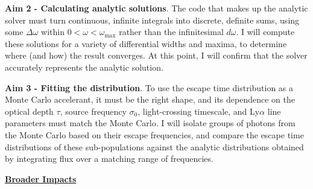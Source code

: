 \documentclass[11pt]{article}
\begin{document}
\noindent \textbf{Aim 2 - Calculating analytic solutions}. The code that makes up the analytic solver must turn continuous, infinite integrals into discrete, definite sums, using some $\Delta \omega$ within $0 < \omega < \omega_{\mathrm{max}}$ rather than the infinitesimal $d\omega$. I will compute these solutions for a variety of differential widths and maxima, to determine where (and how) the result converges. At this point, I will confirm that the solver accurately represents the analytic solution. 

\noindent \textbf{Aim 3 - Fitting the distribution}. To use the escape time distribution as a Monte Carlo accelerant, it must be the right shape, and its dependence on the optical depth $\tau$, source frequency $\sigma_0$, light-crossing timescale, and Ly$\alpha$ line parameters must match the Monte Carlo. I will isolate groups of photons from the Monte Carlo based on their escape frequencies, and compare the escape time distributions of these sub-populations against the analytic distributions obtained by integrating flux over a matching range of frequencies.

\noindent \textbf{\underline{Broader Impacts}} 
\end{document}
